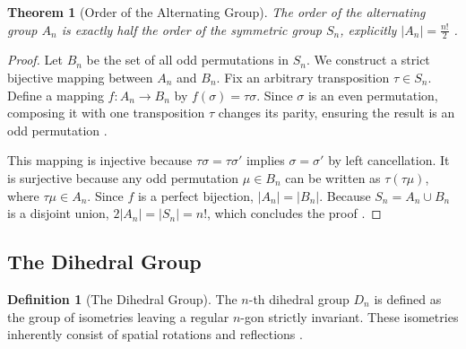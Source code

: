 \documentclass[11pt]{article}
\theoremstyle{definition}
\newtheorem{definition}{Definition}[section]
\theoremstyle{plain}
\newtheorem{theorem}{Theorem}[section]
\theoremstyle{remark}
\begin{document}
\begin{theorem}[Order of the Alternating Group]
The order of the alternating group $A_n$ is exactly half the order of the symmetric group $S_n$, explicitly $|A_n| = \frac{n!}{2}$ \cite{gallian}.
\end{theorem}

\begin{proof}
Let $B_n$ be the set of all odd permutations in $S_n$. We construct a strict bijective mapping between $A_n$ and $B_n$. Fix an arbitrary transposition $\tau \in S_n$. Define a mapping $f: A_n \to B_n$ by $f(\sigma) = \tau \sigma$. 
Since $\sigma$ is an even permutation, composing it with one transposition $\tau$ changes its parity, ensuring the result is an odd permutation \cite{dummit}.

This mapping is injective because $\tau\sigma = \tau\sigma'$ implies $\sigma = \sigma'$ by left cancellation. It is surjective because any odd permutation $\mu \in B_n$ can be written as $\tau(\tau\mu)$, where $\tau\mu \in A_n$. 
Since $f$ is a perfect bijection, $|A_n| = |B_n|$. Because $S_n = A_n \cup B_n$ is a disjoint union, $2|A_n| = |S_n| = n!$, which concludes the proof \cite{fraleigh}.
\end{proof}


\subsection{The Dihedral Group}

\begin{definition}[The Dihedral Group]
The $n$-th dihedral group $D_n$ is defined as the group of isometries leaving a regular $n$-gon strictly invariant. These isometries inherently consist of spatial rotations and reflections \cite{gallian}.
\end{definition}
\end{document}
